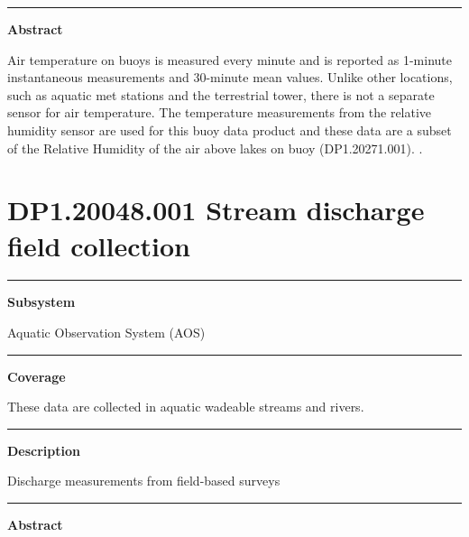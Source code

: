 \documentclass[]{article}
\begin{document}
\begin{center}\rule{0.5\linewidth}{\linethickness}\end{center}

\textbf{Abstract}

Air temperature on buoys is measured every minute and is reported as
1-minute instantaneous measurements and 30-minute mean values. Unlike
other locations, such as aquatic met stations and the terrestrial tower,
there is not a separate sensor for air temperature. The temperature
measurements from the relative humidity sensor are used for this buoy
data product and these data are a subset of the Relative Humidity of the
air above lakes on buoy (DP1.20271.001). \newpage
.

\section{DP1.20048.001 Stream discharge field
collection}\label{dp1.20048.001-stream-discharge-field-collection}

\begin{center}\rule{0.5\linewidth}{\linethickness}\end{center}

\textbf{Subsystem}

Aquatic Observation System (AOS)

\begin{center}\rule{0.5\linewidth}{\linethickness}\end{center}

\textbf{Coverage}

These data are collected in aquatic wadeable streams and rivers.

\begin{center}\rule{0.5\linewidth}{\linethickness}\end{center}

\textbf{Description}

Discharge measurements from field-based surveys

\begin{center}\rule{0.5\linewidth}{\linethickness}\end{center}

\textbf{Abstract}
\end{document}
